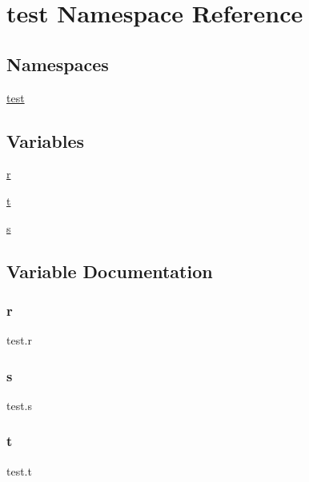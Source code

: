 \hypertarget{namespacetest}{}\section{test Namespace Reference}
\label{namespacetest}
\subsection*{Namespaces}
\begin{DoxyCompactItemize}
\item 
 \hyperlink{namespacetest_1_1test}{test}
\end{DoxyCompactItemize}
\subsection*{Variables}
\begin{DoxyCompactItemize}
\item 
\hyperlink{namespacetest_ac1f92ca15306aee561188e0f37aabc66}{r}
\item 
\hyperlink{namespacetest_ae9ebdaf735944736b55d720cfe9c3e02}{t}
\item 
\hyperlink{namespacetest_a91a88df52e09e64ff8cc9e5d8277c8d4}{s}
\end{DoxyCompactItemize}


\subsection{Variable Documentation}
\mbox{\label{namespacetest_ac1f92ca15306aee561188e0f37aabc66}} 
\subsubsection{\texorpdfstring{r}{r}}
{\footnotesize\ttfamily test.\+r}

\mbox{\label{namespacetest_a91a88df52e09e64ff8cc9e5d8277c8d4}} 
\subsubsection{\texorpdfstring{s}{s}}
{\footnotesize\ttfamily test.\+s}

\mbox{\label{namespacetest_ae9ebdaf735944736b55d720cfe9c3e02}} 
\subsubsection{\texorpdfstring{t}{t}}
{\footnotesize\ttfamily test.\+t}

